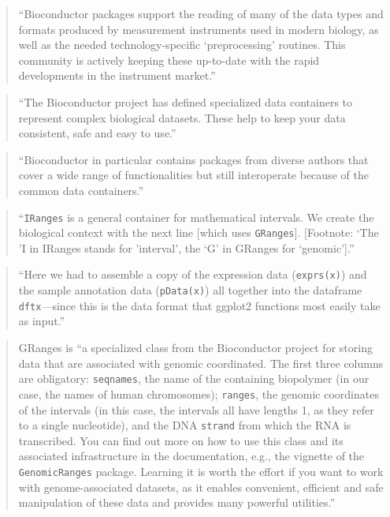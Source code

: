 \documentclass[]{tufte-book}
\begin{document}
\begin{quote}
``Bioconductor packages support the reading of many of the data types and formats
produced by measurement instruments used in modern biology, as well as the
needed technology-specific `preprocessing' routines. This community is
actively keeping these up-to-date with the rapid developments in the
instrument market.'' \citep{holmes2018modern}
\end{quote}

\begin{quote}
``The Bioconductor project has defined specialized data containers to represent
complex biological datasets. These help to keep your data consistent, safe and
easy to use.'' \citep{holmes2018modern}
\end{quote}

\begin{quote}
``Bioconductor in particular contains packages from diverse authors that cover
a wide range of functionalities but still interoperate because of the common
data containers.'' \citep{holmes2018modern}
\end{quote}

\begin{quote}
``\texttt{IRanges} is a general container for mathematical intervals. We create the
biological context with the next line {[}which uses \texttt{GRanges}{]}. {[}Footnote:
`The 'I in IRanges stands for 'interval', the `G' in GRanges for `genomic'{]}.''
\citep{holmes2018modern}
\end{quote}

\begin{quote}
``Here we had to assemble a copy of the expression data (\texttt{exprs(x)}) and
the sample annotation data (\texttt{pData(x)}) all together into the dataframe
\texttt{dftx}---since this is the data format that ggplot2 functions most easily take
as input.'' \citep{holmes2018modern}
\end{quote}

\begin{quote}
GRanges is ``a specialized class from the Bioconductor project for storing
data that are associated with genomic coordinated. The first three columns are
obligatory: \texttt{seqnames}, the name of the containing biopolymer (in our case, the
names of human chromosomes); \texttt{ranges}, the genomic coordinates of the intervals
(in this case, the intervals all have lengths 1, as they refer to a single
nucleotide), and the DNA \texttt{strand} from which the RNA is transcribed. You can
find out more on how to use this class and its associated infrastructure in
the documentation, e.g., the vignette of the \texttt{GenomicRanges} package. Learning
it is worth the effort if you want to work with genome-associated datasets, as
it enables convenient, efficient and safe manipulation of these data and provides
many powerful utilities.'' \citep{holmes2018modern}
\end{quote}
\end{document}
